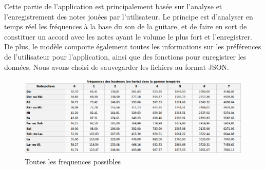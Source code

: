 Cette partie de l'application est principalement basée sur l'analyse et l'enregistrement des notes jouées par 
l'utilisateur. Le principe est d'analyser en temps réel les fréquences à la base du son de la guitare, et de faire en sort de constituer un accord
avec les notes ayant le volume le plus fort et l'enregistrer. De plus, le modèle comporte également toutes les informations sur les préférences
de l'utilisateur pour l'application,   ainsi que des fonctions pour enregistrer les données. Nous avons choisi de sauvegarder les fichiers au format JSON.\newline

\begin{figure}[H]
\centering
\includegraphics[scale=0.5]{Frequences}
\caption{Toutes les frequences possibles}
\end{figure}